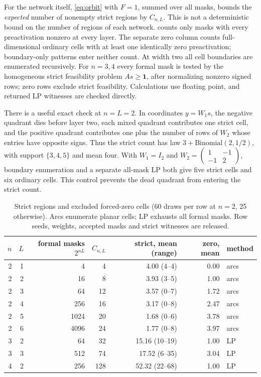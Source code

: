 For the network itself, \cref{eq:orbit} with $F=1$, summed over all masks, bounds the \emph{expected} number of nonempty strict regions by $C_{n,L}$. This is not a deterministic bound on the number of regions of each network.  counts only masks with every preactivation nonzero at every layer. The separate zero column counts full-dimensional ordinary cells with at least one identically zero preactivation; boundary-only patterns enter neither count. At width two all cell boundaries are enumerated recursively. For $n=3,4$ every formal mask is tested by the homogeneous strict feasibility problem $A s\ge\mathbf1$, after normalizing nonzero signed rows; zero rows exclude strict feasibility. Calculations use floating point, and returned LP witnesses are checked directly.

There is a useful exact check at $n=L=2$. In coordinates $y=W_1s$, the negative quadrant dies before layer two, each mixed quadrant contributes one strict cell, and the positive quadrant contributes one plus the number of rows of $W_2$ whose entries have opposite signs. Thus the strict count has law $3+\mathrm{Binomial}(2,1/2)$, with support $\{3,4,5\}$ and mean four. With $W_1=I_2$ and $W_2=\left(\begin{smallmatrix}1&-1\\-1&2\end{smallmatrix}\right)$, boundary enumeration and a separate all-mask LP both give five strict cells and six ordinary cells. This control prevents the dead quadrant from entering the strict count.

\begin{table}[h]\centering\small
\begin{tabular}{rrrrrrl}
\toprule
$n$ & $L$ & formal masks $2^{nL}$ & $C_{n,L}$ & strict, mean (range) & zero, mean & method\\
\midrule
2 & 1 & 4 & 4 & 4.00 (4--4) & 0.00 & arcs\\
2 & 2 & 16 & 8 & 3.93 (3--5) & 1.00 & arcs\\
2 & 3 & 64 & 12 & 3.57 (0--7) & 1.72 & arcs\\
2 & 4 & 256 & 16 & 3.17 (0--8) & 2.47 & arcs\\
2 & 5 & 1024 & 20 & 1.68 (0--6) & 3.78 & arcs\\
2 & 6 & 4096 & 24 & 1.77 (0--8) & 3.97 & arcs\\
3 & 2 & 64 & 32 & 15.16 (10--19) & 1.00 & LP\\
3 & 3 & 512 & 74 & 17.52 (6--35) & 3.04 & LP\\
4 & 2 & 256 & 128 & 52.32 (22--68) & 1.00 & LP\\
\bottomrule
\end{tabular}
\caption{Strict regions and excluded forced-zero cells (60 draws per row at $n=2$, 25 otherwise). Arcs enumerate planar cells; LP exhausts all formal masks. Row seeds, weights, accepted masks and strict witnesses are released.}
\label{tab:regions}
\end{table}

